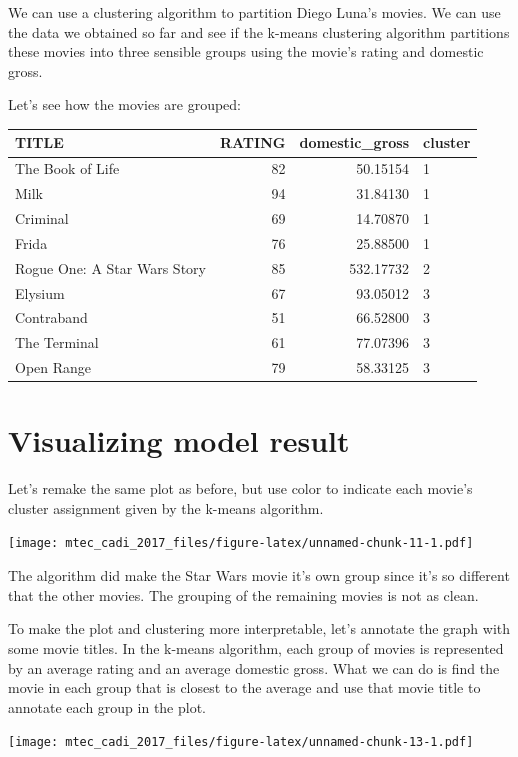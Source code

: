 \documentclass[]{book}
\theoremstyle{definition}
\theoremstyle{definition}
\theoremstyle{remark}
\begin{document}
We can use a clustering algorithm to partition Diego Luna's movies. We
can use the data we obtained so far and see if the k-means clustering
algorithm partitions these movies into three sensible groups using the
movie's rating and domestic gross.

Let's see how the movies are grouped:

\begin{tabular}{l|r|r|l}
\hline
TITLE & RATING & domestic\_gross & cluster\\
\hline
The Book of Life & 82 & 50.15154 & 1\\
\hline
Milk & 94 & 31.84130 & 1\\
\hline
Criminal & 69 & 14.70870 & 1\\
\hline
Frida & 76 & 25.88500 & 1\\
\hline
Rogue One: A Star Wars Story & 85 & 532.17732 & 2\\
\hline
Elysium & 67 & 93.05012 & 3\\
\hline
Contraband & 51 & 66.52800 & 3\\
\hline
The Terminal & 61 & 77.07396 & 3\\
\hline
Open Range & 79 & 58.33125 & 3\\
\hline
\end{tabular}

\section{Visualizing model result}\label{visualizing-model-result}

Let's remake the same plot as before, but use color to indicate each
movie's cluster assignment given by the k-means algorithm.

\texttt{[image: mtec\_cadi\_2017\_files/figure-latex/unnamed-chunk-11-1.pdf]}

The algorithm did make the Star Wars movie it's own group since it's so
different that the other movies. The grouping of the remaining movies is
not as clean.

To make the plot and clustering more interpretable, let's annotate the
graph with some movie titles. In the k-means algorithm, each group of
movies is represented by an average rating and an average domestic
gross. What we can do is find the movie in each group that is closest to
the average and use that movie title to annotate each group in the plot.

\texttt{[image: mtec\_cadi\_2017\_files/figure-latex/unnamed-chunk-13-1.pdf]}
\end{document}
